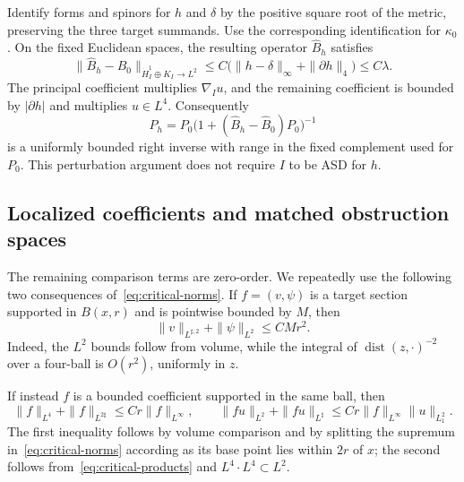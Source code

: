 \documentclass[11pt]{amsart}
\theoremstyle{definition}
\theoremstyle{remark}
\theoremstyle{plain}
\begin{document}
Identify forms and spinors for $h$ and $\delta$ by the positive
square root of the metric, preserving the three target summands.
Use the corresponding identification for $\kappa_0$.  On the fixed
Euclidean spaces, the resulting operator $\widehat B_h$ satisfies
\begin{equation}\label{eq:euclidean-operator-perturbation}
 \|\widehat B_h-\widehat B_0\|_{\dot H_I^1\oplus K_I\to L^2}
 \leq C\bigl(\|h-\delta\|_\infty+\|\partial h\|_4\bigr)
 \leq C\lambda.
\end{equation}
The principal coefficient multiplies $\nabla_Iu$, and the remaining
coefficient is bounded by $|\partial h|$ and multiplies $u\in L^4$.
Consequently
\begin{equation}\label{eq:euclidean-induced-inverse}
 P_h=P_0\bigl(1+(\widehat B_h-\widehat B_0)P_0\bigr)^{-1}
\end{equation}
is a uniformly bounded right inverse with range in the fixed
complement used for $P_0$.  This perturbation argument does not
require $I$ to be ASD for $h$.

\subsection{Localized coefficients and matched obstruction spaces}
The remaining comparison terms are zero-order.  We repeatedly use the
following two consequences of~\eqref{eq:critical-norms}.  If $f=(v,\psi)$
is a target section supported in $B(x,r)$ and is pointwise bounded by $M$,
then
\begin{equation}\label{eq:shrinking-support}
 \|v\|_{L^{\sharp,2}}+\|\psi\|_{L^2}\leq CMr^2.
\end{equation}
Indeed, the $L^2$ bounds follow from volume, while the integral of
$\operatorname{dist}(z,\cdot)^{-2}$ over a four-ball is $O(r^2)$,
uniformly in $z$.

If instead $f$ is a bounded coefficient supported in the same ball, then
\begin{equation}\label{eq:supported-coefficient}
 \|f\|_{L^4}+\|f\|_{L^{2\sharp}}
 \leq Cr\|f\|_{L^\infty},
 \qquad
 \|fu\|_{L^2}+\|fu\|_{L^\sharp}
 \leq Cr\|f\|_{L^\infty}\|u\|_{L^2_1}.
\end{equation}
The first inequality follows by volume comparison and by splitting the
supremum in~\eqref{eq:critical-norms} according as its base point lies within
$2r$ of $x$; the second follows from~\eqref{eq:critical-products} and
$L^4\cdot L^4\subset L^2$.
\end{document}
